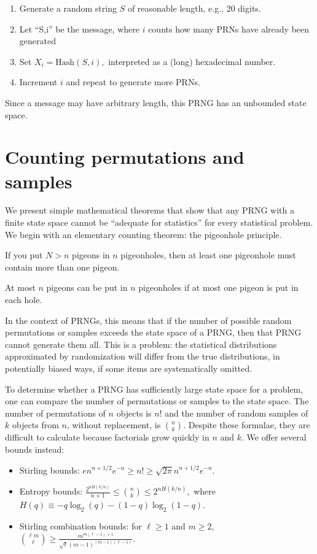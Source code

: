 \documentclass[graybox]{svmult}
\begin{document}
\begin{enumerate}
\item Generate a random string $S$ of reasonable length, e.g., 20 digits.
\item Let ``S,i'' be the message, where $i$ counts how many PRNs have already been generated
\item Set $ X_i = {\mbox{Hash}}(S,i),$ interpreted as a (long) hexadecimal number.
\item Increment $i$ and repeat to generate more PRNs.
\end{enumerate}

Since a message may have arbitrary length, this PRNG has an unbounded state space.


\section{Counting permutations and samples}
\label{sec:count}

We present simple mathematical theorems that show that any PRNG with a finite state space
cannot be ``adequate for statistics'' for every statistical problem.
We begin with an elementary counting theorem: the pigeonhole principle.


\begin{theorem}
If you put $N>n$ pigeons in $n$ pigeonholes, then at least one
pigeonhole must contain more than one pigeon.
\end{theorem}
\begin{corollary}
At most $n$ pigeons can be put in $n$ pigeonholes if at most
one pigeon is put in each hole.
\end{corollary}

In the context of PRNGs, this means that if the number of possible random permutations or samples exceeds
the state space of a PRNG, then that PRNG cannot generate them all.
This is a problem: the statistical distributions approximated by randomization will differ from the true distributions,
in potentially biased ways, if some items are systematically omitted.

To determine whether a PRNG has sufficiently large state space for a problem, one can compare the number of
permutations or samples to the state space.
The number of permutations of $n$ objects is $n!$ and the number of random samples of $k$ objects from $n$,
 without replacement, is $n \choose k$.
Despite these formulae, they are difficult to calculate because factorials grow quickly in $n$ and $k$.
We offer several bounds instead:
\begin{itemize}
\item Stirling bounds: $ e n^{n+1/2} e^{-n} \ge n! \ge \sqrt{2 \pi} n^{n+1/2} e^{-n}.$
\item Entropy bounds:
$ \frac{2^{nH(k/n)}}{n+1} \le {n \choose k} \le 2^{nH(k/n)},$ where $H(q) \equiv -q \log_2(q) - (1-q) \log_2 (1-q)$.
\item Stirling combination bounds:
for $\ell \ge 1$ and $m \ge 2$, $ { {\ell m } \choose { \ell }} \ge \frac{m^{m(\ell-1)+1}}{\sqrt{\ell} (m-1)^{(m-1)(\ell-1)}}. $
\end{itemize}
\end{document}
